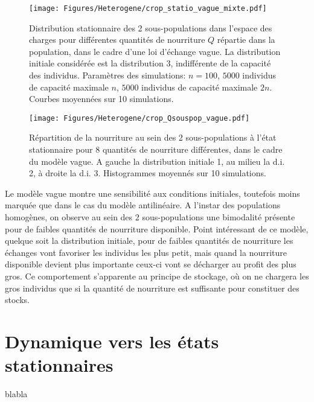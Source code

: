 \begin{figure}[h!]
\centering
\texttt{[image: Figures/Heterogene/crop\_statio\_vague\_mixte.pdf]}
\caption{Distribution stationnaire des 2 sous-populations dans l'espace des charges pour différentes quantités de nourriture $Q$ répartie dans la population, dans le cadre d'une loi d'échange vague. La distribution initiale considérée est la distribution 3, indifférente de la capacité des individus. Paramètres des simulations: $n=100$, $5000$ individus de capacité maximale $n$, $5000$ individus de capacité maximale $2n$. Courbes moyennées sur 10 simulations.}
\label{statio_vague_mixte}
\end{figure}


\begin{figure}[h!]
\centering
\texttt{[image: Figures/Heterogene/crop\_Qsouspop\_vague.pdf]}
\caption{Répartition de la nourriture au sein des 2 sous-populations à l'état stationnaire pour 8 quantités de nourriture différentes, dans le cadre du modèle vague. A gauche la distribution initiale 1, au milieu la d.i. 2, à droite la d.i. 3. Histogrammes moyennés sur 10 simulations.}
\label{Qsouspop_vague}
\end{figure}

Le modèle vague montre une sensibilité aux conditions initiales, toutefois moins marquée que dans le cas du modèle antilinéaire. A l'instar des populations homogènes, on observe au sein des 2 sous-populations une bimodalité présente pour de faibles quantités de nourriture disponible. Point intéressant de ce modèle, quelque soit la distribution initiale, pour de faibles quantités de nourriture les échanges vont favoriser les individus les plus petit, mais quand la nourriture disponible devient plus importante ceux-ci vont se décharger au profit des plus gros. Ce comportement s'apparente au principe de stockage, où on ne chargera les gros individus que si la quantité de nourriture est suffisante pour constituer des stocks.

\section{Dynamique vers les états stationnaires}

blabla